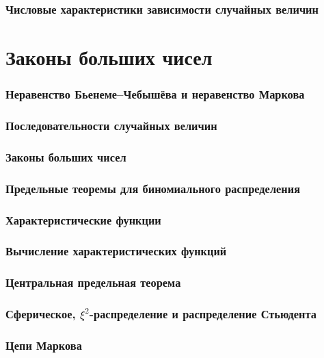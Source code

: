 \section{Числовые характеристики зависимости
случайных величин}


\part{Законы больших чисел}

\section{Неравенство Бьенеме–Чебышёва и
неравенство Маркова}

\section{Последовательности случайных величин}

\section{Законы больших чисел}

\section{Предельные теоремы для
биномиального распределения}

\section{Характеристические функции}

\section{Вычисление характеристических
функций}

\section{Центральная предельная теорема}

\section{Сферическое, $\xi^2$-распределение
и распределение Стьюдента}

\section{Цепи Маркова}









